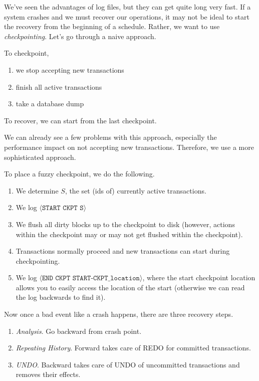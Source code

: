     We've seen the advantages of log files, but they can get quite long very fast. If a system crashes and we must recover our operations, it may not be ideal to start the recovery from the beginning of a schedule. Rather, we want to use \textit{checkpointing}. Let's go through a naive approach. 

    \begin{definition}
       To checkpoint, 
       \begin{enumerate}
         \item we stop accepting new transactions 
         \item finish all active transactions 
         \item take a database dump
       \end{enumerate}
       To recover, we can start from the last checkpoint. 
    \end{definition} 

    We can already see a few problems with this approach, especially the performance impact on not accepting new transactions. Therefore, we use a more sophisticated approach. 

    \begin{definition}
      To place a fuzzy checkpoint, we do the following. 
      \begin{enumerate}
        \item We determine $S$, the set (ids of) currently active transactions. 
        \item We log $\langle \texttt{START CKPT S} \rangle$ 
        \item We flush all dirty blocks up to the checkpoint to disk (however, actions within the checkpoint may or may not get flushed within the checkpoint). 
        \item Transactions normally proceed and new transactions can start during checkpointing. 
        \item We log $\langle \texttt{END CKPT START-CKPT\_location} \rangle$, where the start checkpoint location allows you to easily access the location of the start (otherwise we can read the log backwards to find it). 
      \end{enumerate}
      Now once a bad event like a crash happens, there are three recovery steps. 
      \begin{enumerate}
        \item \textit{Analysis}. Go backward from crash point. 
        \item \textit{Repeating History}. Forward takes care of REDO for committed transactions. 
        \item \textit{UNDO}. Backward takes care of UNDO of uncommitted transactions and removes their effects. 
      \end{enumerate}
    \end{definition} 

